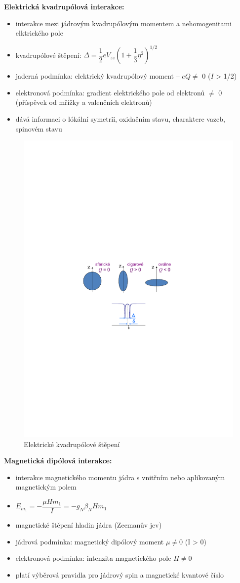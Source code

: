 \textbf{Elektrická kvadrupólová interakce:}

\begin{itemize}
\item interakce mezi jádrovým kvadrupólovým momentem a nehomogenitami elktrického pole
\item kvadrupólové štěpení: $\Delta = \dfrac{1}{2} eV_{zz} (1+\dfrac{1}{3}\eta^2)^{1/2}$ 
\item jaderná podmínka: elektrický kvadrupólový moment -- $eQ \neq$ 0 ($I$ > 1/2)
\item elektronová podmínka: gradient elektrického pole od elektronů $\neq$ 0 (příspěvek od mřížky a valenčních elektronů)
\item dává informaci o lókální symetrii, oxidačním stavu, charaktere vazeb, spinovém stavu

\end{itemize}
\begin{figure}[H]
   \centering
   \includegraphics[width=0.5\linewidth, trim={4cm 11cm 4cm 11cm}, clip]{img/mossbauer_quadrupole.pdf}
   \caption{Elektrické kvadrupólové štěpení}
   \label{fig:6_2_mossbauer_electric_quadrupole}
\end{figure}

\textbf{Magnetická dipólová interakce:}

\begin{itemize}
   \item interakce magnetického momentu jádra s vnitřním nebo aplikovaným magnetickým polem
   \item $E_{m_1} = - \dfrac{\mu H m_1}{I} = - g_N \beta_N H m_1$
   \item magnetické štěpení hladin jádra (Zeemanův jev)
   \item jádrová podmínka: magnetický dipólový moment $\mu \neq 0$ (I > 0)
   \item elektronová podmínka: intenzita magnetického pole $H \neq 0$
   \item platí výběrová pravidla pro jádrový spin a magnetické kvantové číslo
\end{itemize}

